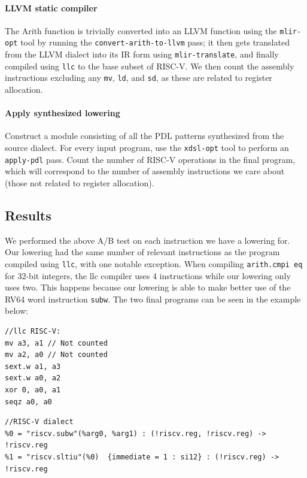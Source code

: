 \paragraph{LLVM static compiler}
The Arith function is trivially converted into an LLVM function using the \texttt{mlir-opt}
tool by running the \texttt{convert-arith-to-llvm} pass; it then gets translated from 
the LLVM dialect into its IR form using \texttt{mlir-translate}, and finally compiled
using \texttt{llc} to the base subset of RISC-V. We then count the assembly instructions
excluding any \texttt{mv}, \texttt{ld}, and \texttt{sd}, as these are related to register
allocation.

\paragraph{Apply synthesized lowering} Construct a module consisting of all the
PDL patterns synthesized from the source dialect. For every input program, use
the \texttt{xdsl-opt} tool to perform an \texttt{apply-pdl} pass. Count the number
of RISC-V operations in the final program, which will correspond to the number
of assembly instructions we care about (those not related to register allocation).

\subsection{Results}

We performed the above A/B test on each instruction we have a lowering for. Our
lowering had the same number of relevant instructions as the program compiled 
using \texttt{llc}, with one notable exception. When compiling \texttt{arith.cmpi eq} for 32-bit integers, the llc compiler uses 4 instructions while our lowering only uses two. This happens 
because our lowering is able to make better use of the RV64 word instruction
\texttt{subw}. The two final programs can be seen in the example below:

\begin{verbatim}
//llc RISC-V:
mv a3, a1 // Not counted
mv a2, a0 // Not counted
sext.w a1, a3
sext.w a0, a2
xor 0, a0, a1 
seqz a0, a0
\end{verbatim}

\begin{verbatim}
//RISC-V dialect
%0 = "riscv.subw"(%arg0, %arg1) : (!riscv.reg, !riscv.reg) -> !riscv.reg    
%1 = "riscv.sltiu"(%0)  {immediate = 1 : si12} : (!riscv.reg) -> !riscv.reg
\end{verbatim}



